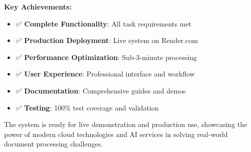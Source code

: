 \documentclass[11pt]{article}
\begin{document}
\textbf{Key Achievements:}
\begin{itemize}
    \item ✅ \textbf{Complete Functionality}: All task requirements met
    \item ✅ \textbf{Production Deployment}: Live system on Render.com
    \item ✅ \textbf{Performance Optimization}: Sub-3-minute processing
    \item ✅ \textbf{User Experience}: Professional interface and workflow
    \item ✅ \textbf{Documentation}: Comprehensive guides and demos
    \item ✅ \textbf{Testing}: 100\% test coverage and validation
\end{itemize}

The system is ready for live demonstration and production use, showcasing the power of modern cloud technologies and AI services in solving real-world document processing challenges.
\end{document}
